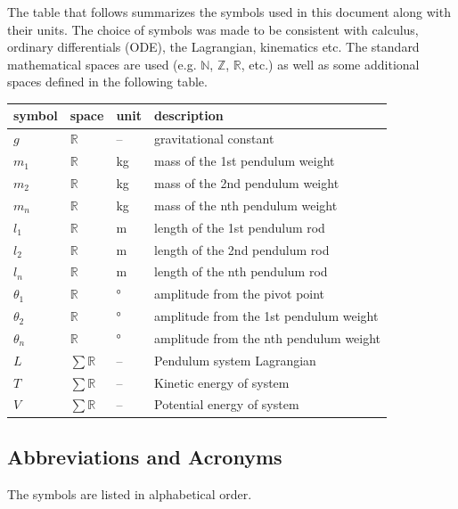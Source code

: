\documentclass[12pt, titlepage]{article}
\begin{document}
The table that follows summarizes the symbols used in this document along with
their units. The choice of symbols was made to be consistent with calculus, 
ordinary differentials (ODE), the Lagrangian, kinematics etc. The standard 
mathematical spaces are used (e.g. $\mathbb{N}$, $\mathbb{Z}$, $\mathbb{R}$, 
etc.) as well as some additional spaces defined in the following table. 
~\newline
\renewcommand{\arraystretch}{1.2}
\noindent \begin{longtable*}{l l l p{8cm}} \toprule
\textbf{symbol} & \textbf{space} & \textbf{unit} & \textbf{description}\\
\midrule 
$g$ & $\mathbb{R}$ & -- & gravitational constant
\\
$m_1$ & $\mathbb{R}$ & kg & mass of the 1st pendulum weight
\\ 
$m_2$ & $\mathbb{R}$ & kg & mass of the 2nd pendulum weight
\\ 
$m_n$ & $\mathbb{R}$ & kg & mass of the nth pendulum weight
\\ 
$l_1$ & $\mathbb{R}$ & m & length of the 1st pendulum rod
\\ 
$l_2$ & $\mathbb{R}$ & m & length of the 2nd pendulum rod
\\ 
$l_n$ & $\mathbb{R}$ & m & length of the nth pendulum rod
\\
$\theta_1$ & $\mathbb{R}$ & \si{\degree} & amplitude from 
the pivot point
\\
$\theta_2$ & $\mathbb{R}$ & \si{\degree} & amplitude from 
the 1st pendulum weight
\\
$\theta_n$ & $\mathbb{R}$ & \si{\degree} & amplitude from 
the nth pendulum weight
\\
$L$ & $\sum\mathbb{R}$ & -- & Pendulum system Lagrangian
\\
$T$ & $\sum\mathbb{R}$ & -- & Kinetic energy of system
\\
$V$ & $\sum\mathbb{R}$ & -- & Potential energy of system
\\
\bottomrule
\end{longtable*}
\newpage
\subsection{Abbreviations and Acronyms}

The symbols are listed in alphabetical order.\\
\end{document}
